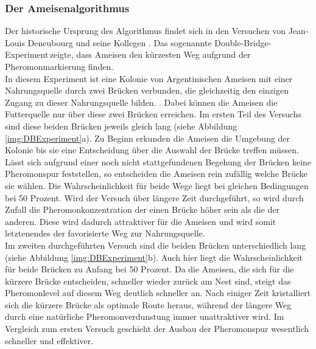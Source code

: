 \documentclass[doktyp=barbeit, sprache=german]{TUBAFarbeiten}
\begin{document}
\subsubsection{Der Ameisenalgorithmus}
Der historische Ursprung des Algorithmus findet sich in den Versuchen von Jean-Louis Deneubourg und seine Kollegen \cite{Biological}. Das sogenannte \glqq Double-Bridge-Experiment\grqq \,zeigte, dass Ameisen den kürzesten Weg aufgrund der Pheromonmarkierung finden. 
\\In diesem Experiment ist eine Kolonie von Argentinischen Ameisen mit einer Nahrungsquelle durch zwei Brücken verbunden, die gleichzeitig den einzigen Zugang zu dieser Nahrungsquelle bilden. \cite{Dorigo2007}. Dabei können die Ameisen die Futterquelle nur über diese zwei Brücken erreichen. Im ersten Teil des Versuchs sind diese beiden Brücken jeweils gleich lang (siehe Abbildung \ref{img:DBExperiment}a). Zu Beginn erkunden die Ameisen die Umgebung der Kolonie bis sie eine Entscheidung über die Auswahl der Brücke treffen müssen. Lässt sich aufgrund einer noch nicht stattgefundenen Begehung der Brücken keine Pheromonspur feststellen, so entscheiden die Ameisen rein zufällig welche Brücke sie wählen. Die Wahrscheinlichkeit für beide Wege liegt bei gleichen Bedingungen bei 50 Prozent. Wird der Versuch über längere Zeit durchgeführt, so wird durch Zufall die Pheromonkonzentration der einen Brücke höher sein als die der anderen. Diese wird dadurch attraktiver für die Ameisen und wird somit letztenendes der favorisierte Weg zur Nahrungsquelle. 
\\Im zweiten durchgeführten Versuch sind die beiden Brücken unterschiedlich lang (siehe Abbildung \ref{img:DBExperiment}b). Auch hier liegt die Wahrscheinlichkeit für beide Brücken zu Anfang bei 50 Prozent. Da die Ameisen, die sich für die kürzere Brücke entscheiden, schneller wieder zurück am Nest sind, steigt das Pheromonlevel auf diesem Weg deutlich schneller an. Nach einiger Zeit kristalliert sich die kürzere Brücke als optimale Route heraus, während der längere Weg durch eine natürliche Pheromonverdunstung immer unattraktiver wird. Im Vergleich zum ersten Versuch geschieht der Ausbau der Pheromonspur wesentlich schneller und effektiver.
\end{document}
